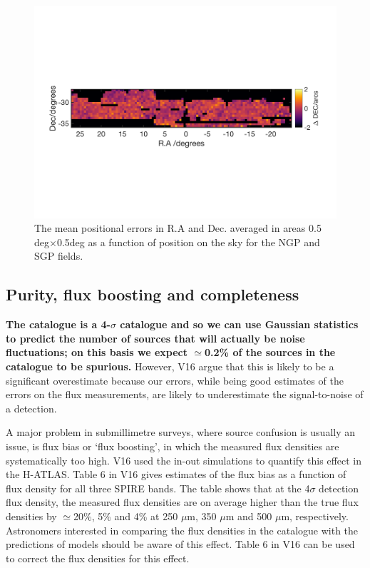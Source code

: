 \documentclass[a4paper,fleqn,usenatbib, twocolumn]{aastex61}
\begin{document}
\begin{figure}
\includegraphics[scale=0.6,trim={0 60mm 0mm 80mm}, clip]{sgp_ddec.png}
\caption{\protect\label{fig_pos_errs} The mean positional errors in
  R.A and Dec. averaged in areas 0.5 deg$\times$0.5deg as a
  function of position on the sky for the NGP and SGP
  fields. 
}
\end{figure} 

\subsection{Purity, flux boosting and completeness}

{\bf The catalogue is a 4-$\sigma$ catalogue and so we can use
Gaussian statistics to predict the number of sources that will actually be noise 
fluctuations; on this basis we 
expect $\simeq$0.2\% of the sources
in the catalogue to be spurious.} However, V16 argue that this is
likely to be a significant overestimate because our errors, while
being good estimates of the errors on the flux measurements, are
likely to underestimate the signal-to-noise of a detection.

A major problem in submillimetre surveys, where source confusion is
usually an issue, is flux bias or `flux boosting', in which the
measured flux densities are systematically too high. V16 used the
in-out simulations to quantify this effect in the H-ATLAS. Table 6 in
V16 gives estimates of the flux bias as a function of flux density for
all three SPIRE bands. The table shows that at the 4$\sigma$ detection
flux density, the measured flux densities are on average higher than
the true flux densities by $\simeq$20\%, 5\% and 4\% at 250 $\mu$m,
350 $\mu$m and 500 $\mu$m, respectively. Astronomers interested in
comparing the flux densities in the catalogue with the predictions of
models should be aware of this effect. Table 6 in V16 can be used to
correct the flux densities for this effect.
\end{document}
